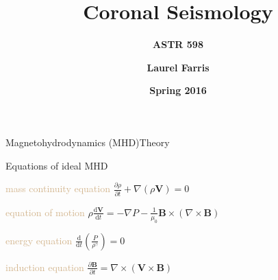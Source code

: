 \documentclass[11pt,table]{beamer}
\title{\textbf{Coronal Seismology}}
\subtitle{\textbf{ASTR 598}}
\date{\textbf{Spring 2016}}
\author{\textbf{Laurel Farris}}
\begin{document}
{
\begin{frame}
    \titlepage{}
\end{frame}}%
\begin{frame}{Magnetohydrodynamics (MHD)}{Theory}
    \begin{block}{Equations of ideal MHD}
        \begin{list}{}
            \item \textcolor{tan}{mass continuity equation}
                $\frac{\partial\rho}{\partial{t}} +
                \nabla\left(\rho\mathbf{V}\right) = 0 $
            \item \textcolor{tan}{equation of motion}
                $\rho\frac{\textrm{d}\mathbf{V}}{\textrm{d}t} =
                -\nabla{P} - \frac{1}{\mu_{0}}\mathbf{B}\times\left(
                \nabla\times\mathbf{B}\right) $
            \item \textcolor{tan}{energy equation}
                $\frac{\textrm{d}}{\textrm{d}t}
                \left(\frac{P}{\rho^{\gamma}}\right) = 0$
            \item \textcolor{tan}{induction equation}
                $\frac{\partial\mathbf{B}}{\partial{t}} =
                \nabla\times\left(\mathbf{V}\times
                \mathbf{B}\right)$
        \end{list}
    \end{block}
\end{frame}%
\end{document}
